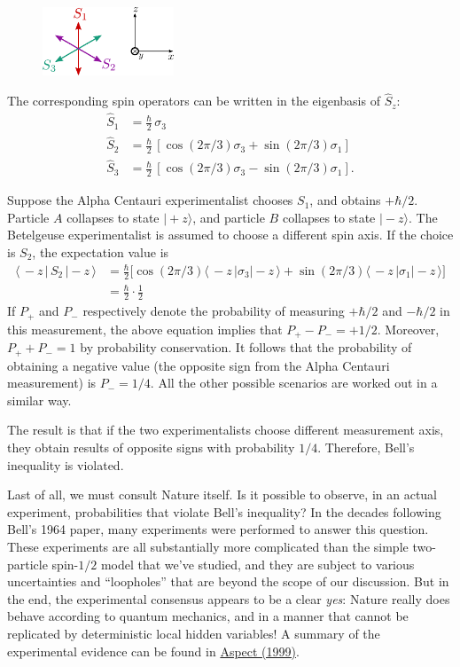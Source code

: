 \documentclass[pra,12pt]{revtex4}
\begin{document}
\begin{figure}[h]
  \centering\includegraphics[width=0.35\textwidth]{bellaxes}
\end{figure}

The corresponding spin operators can be written in the eigenbasis of
$\hat{S}_z$:
$$\begin{aligned}\hat{S}_1 &= \frac{\hbar}{2} \, \sigma_3 \\ \hat{S}_2 &= \frac{\hbar}{2} \, \left[\cos(2\pi/3) \sigma_3 + \sin(2\pi/3)\sigma_1\right]  \\   \hat{S}_3 &= \frac{\hbar}{2} \, \left[\cos(2\pi/3) \sigma_3 - \sin(2\pi/3)\sigma_1\right].\end{aligned}$$

Suppose the Alpha Centauri experimentalist chooses $S_1$, and obtains
$+\hbar/2$.  Particle $A$ collapses to state $|\!+\!z\rangle$, and
particle $B$ collapses to state $|\!-\!z\rangle$.  The Betelgeuse
experimentalist is assumed to choose a different spin axis.  If the
choice is $S_2$, the expectation value is
$$\begin{aligned}\langle\, - z \, | \, S_2 \,|-\!z\,\rangle &= \frac{\hbar}{2} \Big[\cos(2\pi/3) \langle\,- z\,|\sigma_3| - \!z\,\rangle + \sin(2\pi/3)\langle\,- z\,|\sigma_1|-\!z\,\rangle\Big]\\ &= \frac{\hbar}{2} \cdot \frac{1}{2} \end{aligned}$$
If $P_+$ and $P_-$ respectively denote the probability of measuring
$+\hbar/2$ and $-\hbar/2$ in this measurement, the above equation
implies that $P_+ - P_- = + 1/2$.  Moreover, $P_+ + P_- = 1$ by
probability conservation.  It follows that the probability of
obtaining a negative value (the opposite sign from the Alpha Centauri
measurement) is $P_- = 1/4$.  All the other possible scenarios are
worked out in a similar way.

The result is that if the two experimentalists choose different
measurement axis, they obtain results of opposite signs with
probability $1/4$.  Therefore, Bell's inequality is violated.

Last of all, we must consult Nature itself.  Is it possible to
observe, in an actual experiment, probabilities that violate Bell's
inequality?  In the decades following Bell's 1964 paper, many
experiments were performed to answer this question.  These experiments
are all substantially more complicated than the simple two-particle
spin-$1/2$ model that we've studied, and they are subject to various
uncertainties and ``loopholes'' that are beyond the scope of our
discussion.  But in the end, the experimental consensus appears to be
a clear \textit{yes}: Nature really does behave according to quantum
mechanics, and in a manner that cannot be replicated by deterministic
local hidden variables!  A summary of the experimental evidence can be
found in \hyperref[cite:aspect]{Aspect (1999)}.
\end{document}
